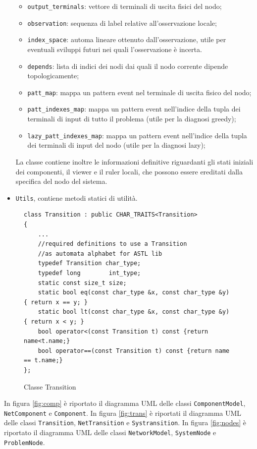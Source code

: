 \begin{itemize}
\begin{itemize}
\item \verb|output_terminals|: vettore di terminali di uscita fisici del nodo;
\item \verb|observation|: sequenza di label relative all'osservazione locale;
\item \verb|index_space|: automa lineare ottenuto dall'osservazione, utile per eventuali sviluppi futuri nei quali l'osservazione è incerta.
\item \verb|depends|: lista di indici dei nodi dai quali il nodo corrente dipende topologicamente;
\item \verb|patt_map|: mappa un pattern event nel terminale di uscita fisico del nodo;
\item \verb|patt_indexes_map|: mappa un pattern event nell'indice della tupla dei terminali di input di tutto il problema (utile per la diagnosi greedy);
\item \verb|lazy_patt_indexes_map|: mappa un pattern event nell'indice della tupla dei terminali di input del nodo (utile per la diagnosi lazy);
\end{itemize}
La classe contiene inoltre le informazioni definitive riguardanti gli stati iniziali dei componenti, il viewer e il ruler locali, che possono essere ereditati dalla specifica del nodo del sistema.
\item \verb|Utils|, contiene metodi statici di utilità.
\end{itemize}


\begin{figure}[htbp]
\begin{verbatim}
class Transition : public CHAR_TRAITS<Transition>
{
    ...
    //required definitions to use a Transition 
    //as automata alphabet for ASTL lib
    typedef Transition char_type;
    typedef long        int_type;
    static const size_t size;
    static bool eq(const char_type &x, const char_type &y) { return x == y; }
    static bool lt(const char_type &x, const char_type &y) { return x < y; }
    bool operator<(const Transition t) const {return name<t.name;}
    bool operator==(const Transition t) const {return name == t.name;}
};
\end{verbatim}
\caption{Classe Transition}
\label{class_trans}
\end{figure}

In figura \ref{fig:comp} è riportato il diagramma UML delle classi \verb|ComponentModel|, \verb|NetComponent| e \verb|Component|.
In figura \ref{fig:trans} è riportati il diagramma UML delle classi \verb|Transition|, \verb|NetTransition| e \verb|Systransition|.
In figura \ref{fig:nodes} è riportato il diagramma UML delle classi \verb|NetworkModel|, \verb|SystemNode| e \verb|ProblemNode|.

